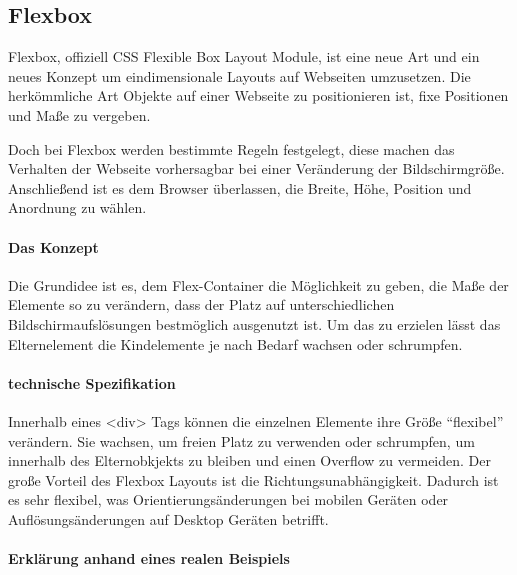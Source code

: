 \hypertarget{flexbox}{%
\subsection{Flexbox}\label{flexbox}}

Flexbox, offiziell CSS Flexible Box Layout Module, ist eine neue Art und
ein neues Konzept um eindimensionale Layouts auf Webseiten umzusetzen.
Die herkömmliche Art Objekte auf einer Webseite zu positionieren ist,
fixe Positionen und Maße zu vergeben.

Doch bei Flexbox werden bestimmte Regeln festgelegt, diese machen das
Verhalten der Webseite vorhersagbar bei einer Veränderung der
Bildschirmgröße. Anschließend ist es dem Browser überlassen, die Breite,
Höhe, Position und Anordnung zu wählen.

\hypertarget{das-konzept}{%
\paragraph{Das Konzept}\label{das-konzept}}

Die Grundidee ist es, dem Flex-Container die Möglichkeit zu geben, die
Maße der Elemente so zu verändern, dass der Platz auf unterschiedlichen
Bildschirmaufslösungen bestmöglich ausgenutzt ist. Um das zu erzielen
lässt das Elternelement die Kindelemente je nach Bedarf wachsen oder
schrumpfen.

\hypertarget{technische-spezifikation}{%
\paragraph{technische Spezifikation}\label{technische-spezifikation}}

Innerhalb eines \textless{}div\textgreater{} Tags können die einzelnen
Elemente ihre Größe ``flexibel'' verändern. Sie wachsen, um freien Platz
zu verwenden oder schrumpfen, um innerhalb des Elternobkjekts zu bleiben
und einen Overflow zu vermeiden. Der große Vorteil des Flexbox Layouts
ist die Richtungsunabhängigkeit. Dadurch ist es sehr flexibel, was
Orientierungsänderungen bei mobilen Geräten oder Auflösungsänderungen
auf Desktop Geräten betrifft.

\hypertarget{erkluxe4rung-anhand-eines-realen-beispiels}{%
\paragraph{Erklärung anhand eines realen
Beispiels}\label{erkluxe4rung-anhand-eines-realen-beispiels}}

